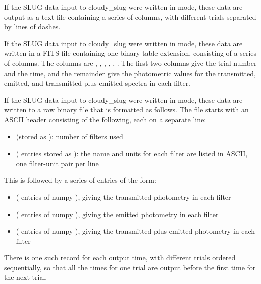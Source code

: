 \documentclass[letterpaper,10pt,english]{sphinxmanual}
\begin{document}
If the SLUG data input to cloudy\_slug were written in  mode,
these data are output as a text file containing a series of columns,
with different trials separated by lines of dashes.

If the SLUG data input to cloudy\_slug were written in  mode,
these data are written in a FITS file containing one binary table
extension, consisting of a series of columns. The columns are
, , , ,
, . The first two columns
give the trial number and the time, and the remainder give the
photometric values for the transmitted, emitted, and transmitted plus
emitted spectra in each filter.

If the SLUG data input to cloudy\_slug were written in  mode,
these data are written to a raw binary file that is formatted as
follows. The file starts with an ASCII header consisting of the
following, each on a separate line:
\begin{itemize}
\item {} 
 (stored as ): number of filters used

\item {} 
  ( entries stored as ): the name and units for each filter are listed in ASCII, one
filter-unit pair per line

\end{itemize}

This is followed by a series of entries of the form:
\begin{itemize}
\item {} 
 ( entries of numpy
), giving the transmitted photometry in each filter

\item {} 
 ( entries of numpy
), giving the emitted photometry in each filter

\item {} 
 ( entries of numpy
), giving the transmitted plus emitted photometry in each
filter

\end{itemize}

There is one such record for each output time, with different trials
ordered sequentially, so that all the times for one trial are output
before the first time for the next trial.
\end{document}
